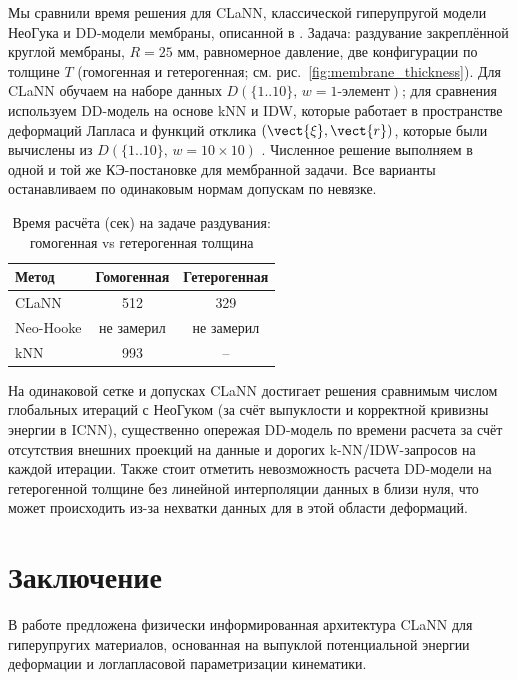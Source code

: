   Мы сравнили время решения для CLaNN, классической гиперупругой модели Нео\textendash Гука и DD-модели мембраны, описанной в \cite{xi2023}.
  Задача: раздувание закреплённой круглой мембраны, $R{=}25$ мм, равномерное давление, две конфигурации по толщине $T$ (гомогенная и гетерогенная; см. рис.~\ref{fig:membrane_thickness}).
  Для CLaNN обучаем на наборе данных $D(\{1..10\},\,w{=}\text{1-элемент})$; для сравнения используем DD-модель на основе 
  kNN и IDW, которые работает в пространстве деформаций Лапласа и функций отклика $(\vect{\xi}, \vect{r})$, 
  которые были вычислены из $D(\{1..10\},\,w{=}\text{10}\times\text{10})$ \cite{xi2023}.
  Численное решение выполняем в одной и той же КЭ-постановке для мембранной задачи. 
  Все варианты останавливаем по одинаковым нормам допускам по невязке.

\begin{table}[htbp]
\centering
\caption{Время расчёта (сек) на задаче раздувания: гомогенная vs гетерогенная толщина}
\label{tab:experiments_summary}
\begin{tabular}{|l|c|c|}
\hline
\textbf{Метод} & \textbf{Гомогенная} & \textbf{Гетерогенная} \\
\hline
CLaNN & 512 & 329  \\
\hline
Neo-Hooke & не замерил & не замерил\\
\hline
kNN & 993 & -- \\
\hline
\end{tabular}
\end{table}

На одинаковой сетке и допусках CLaNN достигает решения сравнимым числом глобальных итераций с Нео\textendash Гуком
(за счёт выпуклости и корректной кривизны энергии в ICNN), существенно опережая DD-модель по времени расчета
за счёт отсутствия внешних проекций на данные и дорогих k-NN/IDW-запросов на каждой итерации.
Также стоит отметить невозможность расчета DD-модели на гетерогенной толщине без линейной интерполяции данных в близи нуля, 
что может происходить из-за нехватки данных для в этой области деформаций.


\section{Заключение}

  В работе предложена физически информированная архитектура CLaNN для гиперупругих материалов, основанная на выпуклой
  потенциальной энергии деформации и лог\textendash лапласовой параметризации кинематики.

